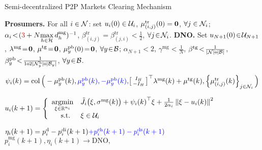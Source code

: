 \begin{algorithm*}[htbp]
\caption{Semi-decentralized P2P Markets Clearing Mechanism}
\label{alg:alg1}
\begin{algorithmic}[1]
\small

\init{ }
\State
\textbf{Prosumers.} For all $i \in \mathcal N$: set $u_i(0) \in \mathcal U_i$, $\mu^{\text{tr}}_{(i,j)}(0) = \mathbf{0}$, $\forall j \in \mathcal N_i$; $\alpha_i \!<\! 
(\textcolor{red}{3} +N \underset{h\in \mathcal H}{\max}\, d_h^{\text{mg}})^{-1}$, $\beta^{\text{tr}}_{(i,j)}\! =\! \beta^{\text{tr}}_{ (j,i)} \!<\! \frac{1}{2}$, $\forall j \!\in\! \mathcal N_i$.
\State
\textbf{DNO.} Set $u_{N+1}(0) \!\in\! \mathcal U_{N+1}$, $\lambda^{\text{mg}}\!=\!\mathbf{0}$, $\mu^{\text{tg}} \!=\! \mathbf{0}$, $\mu_y^{\text{pb}}(0)\! = \!\mathbf{0}$, $\forall y \!\in\! \mathcal B$; $\alpha_{N+1} \!<\!2$, $\gamma^{\text{mg}} \!<\! \frac{1}{N}$, $\beta^{\text{tg}}\! <\! \frac{1}{|\mathcal N| \!+\! |\mathcal B|}$, $\beta_y^{\text{pb}} \!<\! \frac{1}{1\!+\!2|\mathcal N_y^{\mathrm{b}}|\!+\!|\mathcal B_y|}$,  $\forall y\!\in\! \mathcal B $.%

\Endinit

\smallskip
\IUC{ }
\smallskip
{}
\PRO{ }
\Primal{ }

\smallskip
\State 
$\psi_i(k) = 
	\operatorname{col} \Big(-\mu_y^{\text{pb}}(k),\color{blue}{\mu_y^{\text{pb}}(k), -\mu_y^{\text{pb}}(k),}\color{black}
	{
	\left[
	\begin{smallmatrix}
	I_H\\
	- I_H 
	\end{smallmatrix}
	\right] 
	}^\top \lambda^{\text{mg}}(k) + \mu^{\text{tg}}(k),
	\left\{ {\mu^{\text{tr}}_{(i,j)}(k)}\right\}_{j \in \mathcal N_i}   \Big)$

\State
$u_i(k+1)   =
\left\{
\begin{array}{r l}
	\underset{\xi \in \mathbb R^{n_i}}{\operatorname{argmin}} & 
	\tilde J_{i} \big( \xi, \sigma^{\text{mg}}(k) \big) 
	+ {\psi_i(k)}^\top \xi + \frac{1}{2 \alpha_i}
	\left\| \xi - u_i(k) 
	\textstyle
	  \right\|^2 \\
	\text{s.t. } & \xi \in \mathcal U_i
\end{array} 
	\right.	$
\EndPrimal

\State $\eta_i(k+1)= p^{\text{d}}_i-p^{\text{di}}_i(k+1)\color{blue}{+p^{\text{ch}}_i(k+1)- p^{\text{ds}}_i(k+1)}\color{black}$
\State
$
p^{\textrm{mg}}_{i}(k+1), \eta_i(k+1)  \longrightarrow  \text{DNO,}
$
     

\end{algorithmic}
\end{algorithm*}
